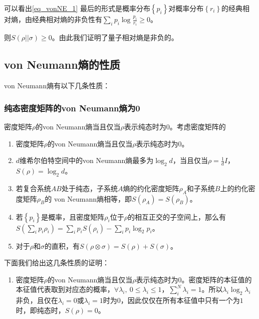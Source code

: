 可以看出\autoref{eq_vonNE_1} 最后的形式是概率分布$\left\{p_i\right\}$对概率分布$\left\{r_i\right\}$的经典相对熵，由经典相对熵的非负性有$\sum\limits_i p_i \log\frac{p_i}{r_i}\geqslant 0$。

则$S\left(\rho || \sigma\right)\geqslant 0$。由此我们证明了量子相对熵是非负的。

\subsection{von Neumann熵的性质}

von Neumann熵有以下几条性质：

\subsubsection{纯态密度矩阵的von Neumann熵为0}
密度矩阵$\rho$的von Neumann熵当且仅当$\rho$表示纯态时为0。考虑密度矩阵的

\begin{enumerate}
\item 密度矩阵$\rho$的von Neumann熵当且仅当$\rho$表示纯态时为0。
\item $d$维希尔伯特空间中的von Neumann熵最多为$\log_2 d$，当且仅当$\rho = \frac{1}{d}I$，$S(\rho) = \log_2 d$。
\item 若复合系统$AB$处于纯态，子系统$A$熵的约化密度矩阵$\rho_A$和子系统$B$上的约化密度矩阵$\rho_B$的 von Neumann熵相等，即$S\left(\rho_A\right) = S\left(\rho_B\right)$。
\item 若$\left\{p_i\right\}$是概率，且密度矩阵$\rho_i$位于$\rho$的相互正交的子空间上，那么有$S\left(\sum\limits_ip_i\rho_i\right) = \sum\limits_ip_iS\left(\rho_i\right) - \sum\limits_ip_i\log_2p_i$。
\item 对于$\rho$和$\sigma$的直积，有$S\left(\rho\otimes\sigma\right) = S\left(\rho\right) + S\left(\sigma\right)$。
\end{enumerate}

下面我们给出这几条性质的证明：

\begin{enumerate}
\item 密度矩阵$\rho$的von Neumann熵当且仅当$\rho$表示纯态时为0。密度矩阵的本征值的本征值代表取到对应态的概率，$\forall \lambda_i ,~ 0\leqslant \lambda_i \leqslant1$，$\sum_i^N \lambda_i = 1$。所以$\lambda_i \log_2 \lambda_i$非负，且仅在$\lambda_i = 0$或$\lambda_i = 1$时为$0$，因此仅仅在所有本征值中只有一个为$1$时，即纯态时，$S\left(\rho\right) = 0$。
\end{enumerate}


